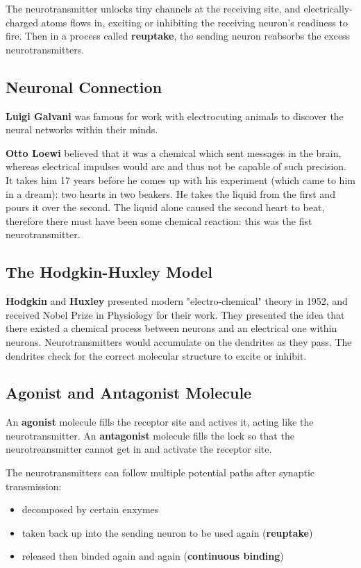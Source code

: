 \documentclass[12pt]{article}
\begin{document}
The neurotransmitter unlocks tiny channels at the receiving site, and electrically-charged atoms flows in, exciting or inhibiting the receiving neuron's readiness to fire. Then in a process called \textbf{reuptake}, the sending neuron reabsorbs the excess neurotransmitters.

\subsection*{Neuronal Connection}
{\bf Luigi Galvani} was famous for work with electrocuting animals to discover the neural networks within their minds.

{\bf Otto Loewi} believed that it was a chemical which sent messages in the brain, whereas electrical impulses would arc and thus not be capable of such precision. It takes him 17 years before he comes up with his experiment (which came to him in a dream): two hearts in two beakers. He takes the liquid from the first and pours it over the second. The liquid alone caused the second heart to beat, therefore there must have been some chemical reaction: this was the fist neurotransmitter.

\subsection*{The Hodgkin-Huxley Model}
{\bf Hodgkin} and {\bf Huxley} presented modern "electro-chemical" theory in 1952, and received Nobel Prize in Physiology for their work. They presented the idea that there existed a chemical process between neurons and an electrical one within neurons. Neurotransmitters would accumulate on the dendrites as they pass. The dendrites check for the correct molecular structure to excite or inhibit. 

\subsection*{Agonist and Antagonist Molecule}
An \textbf{agonist} molecule fills the receptor site and actives it, acting like the neurotransmitter. An \textbf{antagonist} molecule fills the lock so that the neurotreansmitter cannot get in and activate the receptor site.

The neurotransmitters can follow multiple potential paths after synaptic transmission:
\begin{itemize}
\item decomposed by certain enxymes
\item taken back up into the sending neuron to be used again ({\bf reuptake})
\item released then binded again and again ({\bf continuous binding})
\end{itemize}
\end{document}

